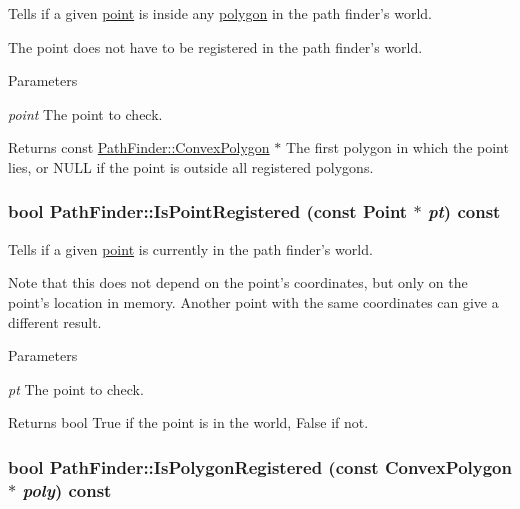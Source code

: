 Tells if a given \hyperlink{structPathFinder_1_1Point}{point} is inside any \hyperlink{structPathFinder_1_1ConvexPolygon}{polygon} in the path finder's world. 

The point does not have to be registered in the path finder's world.


\begin{DoxyParams}{Parameters}
\item[{\em point}]The point to check. \end{DoxyParams}
\begin{DoxyReturn}{Returns}
const \hyperlink{structPathFinder_1_1ConvexPolygon}{PathFinder::ConvexPolygon} $\ast$ The first polygon in which the point lies, or NULL if the point is outside all registered polygons. 
\end{DoxyReturn}
\hypertarget{classPathFinder_a6f0e23839f34803a1e712ff727ec734f}{
\subsubsection[{IsPointRegistered}]{\setlength{\rightskip}{0pt plus 5cm}bool PathFinder::IsPointRegistered (const {\bf Point} $\ast$ {\em pt}) const}}
\label{classPathFinder_a6f0e23839f34803a1e712ff727ec734f}


Tells if a given \hyperlink{structPathFinder_1_1Point}{point} is currently in the path finder's world. 

Note that this does not depend on the point's coordinates, but only on the point's location in memory. Another point with the same coordinates can give a different result.


\begin{DoxyParams}{Parameters}
\item[{\em pt}]The point to check. \end{DoxyParams}
\begin{DoxyReturn}{Returns}
bool True if the point is in the world, False if not. 
\end{DoxyReturn}
\hypertarget{classPathFinder_ae4c46e0856f22121c4ac7bb07cc86dc1}{
\subsubsection[{IsPolygonRegistered}]{\setlength{\rightskip}{0pt plus 5cm}bool PathFinder::IsPolygonRegistered (const {\bf ConvexPolygon} $\ast$ {\em poly}) const}}
\label{classPathFinder_ae4c46e0856f22121c4ac7bb07cc86dc1}


